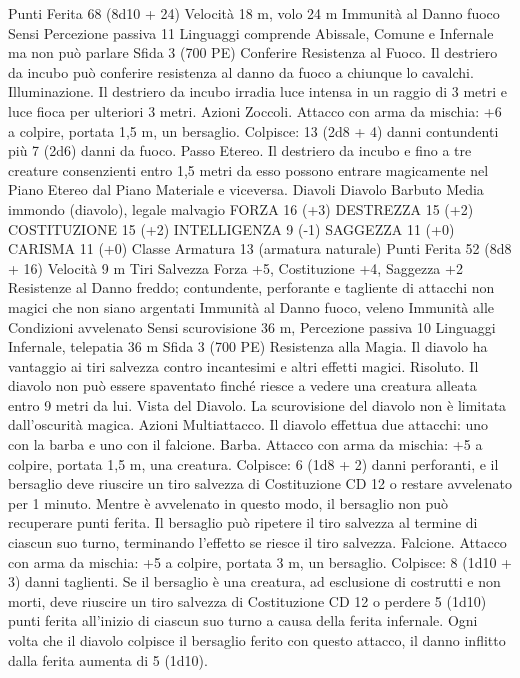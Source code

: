 \begin{multicols}{2}
Punti Ferita 68 (8d10 + 24)
Velocità 18 m, volo 24 m
Immunità al Danno fuoco
Sensi Percezione passiva 11
Linguaggi comprende Abissale, Comune e Infernale ma non può
parlare
Sfida 3 (700 PE)
Conferire Resistenza al Fuoco. Il destriero da incubo può
conferire resistenza al danno da fuoco a chiunque lo cavalchi.
Illuminazione. Il destriero da incubo irradia luce intensa in un
raggio di 3 metri e luce fioca per ulteriori 3 metri.
Azioni
Zoccoli. Attacco con arma da mischia: +6 a colpire, portata 1,5
m, un bersaglio.
Colpisce: 13 (2d8 + 4) danni contundenti più 7 (2d6) danni da
fuoco.
Passo Etereo. Il destriero da incubo e fino a tre creature
consenzienti entro 1,5 metri da esso possono entrare
magicamente nel Piano Etereo dal Piano Materiale e viceversa.
Diavoli
Diavolo Barbuto
Media immondo (diavolo), legale malvagio
FORZA 16 (+3)
DESTREZZA 15 (+2)
COSTITUZIONE 15 (+2)
INTELLIGENZA 9 (-1)
SAGGEZZA 11 (+0)
CARISMA 11 (+0)
Classe Armatura 13 (armatura naturale)
Punti Ferita 52 (8d8 + 16)
Velocità 9 m
Tiri Salvezza Forza +5, Costituzione +4, Saggezza +2
Resistenze al Danno freddo; contundente, perforante e tagliente
di attacchi non magici che non siano argentati
Immunità al Danno fuoco, veleno
Immunità alle Condizioni avvelenato
Sensi scurovisione 36 m, Percezione passiva 10
Linguaggi Infernale, telepatia 36 m
Sfida 3 (700 PE)
Resistenza alla Magia. Il diavolo ha vantaggio ai tiri salvezza
contro incantesimi e altri effetti magici.
Risoluto. Il diavolo non può essere spaventato finché riesce a
vedere una creatura alleata entro 9 metri da lui.
Vista del Diavolo. La scurovisione del diavolo non è limitata
dall’oscurità magica.
Azioni
Multiattacco. Il diavolo effettua due attacchi: uno con la barba e
uno con il falcione.
Barba. Attacco con arma da mischia: +5 a colpire, portata 1,5 m,
una creatura.
Colpisce: 6 (1d8 + 2) danni perforanti, e il bersaglio deve
riuscire un tiro salvezza di Costituzione CD 12 o restare
avvelenato per 1 minuto. Mentre è avvelenato in questo modo, il
bersaglio non può recuperare punti ferita. Il bersaglio può
ripetere il tiro salvezza al termine di ciascun suo turno,
terminando l’effetto se riesce il tiro salvezza.
Falcione. Attacco con arma da mischia: +5 a colpire, portata 3
m, un bersaglio.
Colpisce: 8 (1d10 + 3) danni taglienti. Se il bersaglio è una
creatura, ad esclusione di costrutti e non morti, deve riuscire un
tiro salvezza di Costituzione CD 12 o perdere 5 (1d10) punti
ferita all’inizio di ciascun suo turno a causa della ferita infernale.
Ogni volta che il diavolo colpisce il bersaglio ferito con questo
attacco, il danno inflitto dalla ferita aumenta di 5 (1d10).

\end{multicols}
